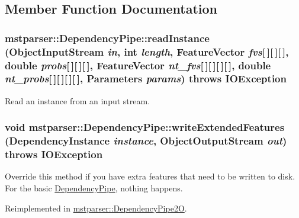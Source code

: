 \subsection{Member Function Documentation}
\hypertarget{classmstparser_1_1DependencyPipe_ac85ec2345561e573fe598a255117c378}{
\subsubsection[{readInstance}]{ mstparser::DependencyPipe::readInstance (ObjectInputStream {\em in}, \/  int {\em length}, \/  {\bf FeatureVector} {\em fvs}\mbox{[}$\,$\mbox{]}\mbox{[}$\,$\mbox{]}\mbox{[}$\,$\mbox{]}, \/  double {\em probs}\mbox{[}$\,$\mbox{]}\mbox{[}$\,$\mbox{]}\mbox{[}$\,$\mbox{]}, \/  {\bf FeatureVector} {\em nt\_\-fvs}\mbox{[}$\,$\mbox{]}\mbox{[}$\,$\mbox{]}\mbox{[}$\,$\mbox{]}\mbox{[}$\,$\mbox{]}, \/  double {\em nt\_\-probs}\mbox{[}$\,$\mbox{]}\mbox{[}$\,$\mbox{]}\mbox{[}$\,$\mbox{]}\mbox{[}$\,$\mbox{]}, \/  {\bf Parameters} {\em params})  throws IOException }}
\label{classmstparser_1_1DependencyPipe_ac85ec2345561e573fe598a255117c378}
Read an instance from an input stream. \hypertarget{classmstparser_1_1DependencyPipe_a08ecc2b509221d129c2e46fc143a80bc}{
\subsubsection[{writeExtendedFeatures}]{\setlength{\rightskip}{0pt plus 5cm}void mstparser::DependencyPipe::writeExtendedFeatures ({\bf DependencyInstance} {\em instance}, \/  ObjectOutputStream {\em out})  throws IOException }}
\label{classmstparser_1_1DependencyPipe_a08ecc2b509221d129c2e46fc143a80bc}
Override this method if you have extra features that need to be written to disk. For the basic \hyperlink{classmstparser_1_1DependencyPipe}{DependencyPipe}, nothing happens. 

Reimplemented in \hyperlink{classmstparser_1_1DependencyPipe2O_a1a2edeb57ac26d9c0c3ce7026393ef29}{mstparser::DependencyPipe2O}.

